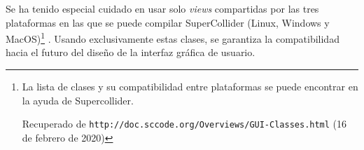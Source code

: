 Se ha tenido especial cuidado en usar solo \textit{views} compartidas por las tres plataformas en las que se puede compilar SuperCollider (Linux, Windows y MacOS)\footnote{La lista de clases y su compatibilidad entre plataformas se puede encontrar en la ayuda de Supercollider. 

Recuperado de \texttt{http://doc.sccode.org/Overviews/GUI-Classes.html} (16 de febrero de 2020) } . Usando exclusivamente estas clases, se garantiza la compatibilidad hacia el futuro del diseño de la interfaz gráfica de usuario.

